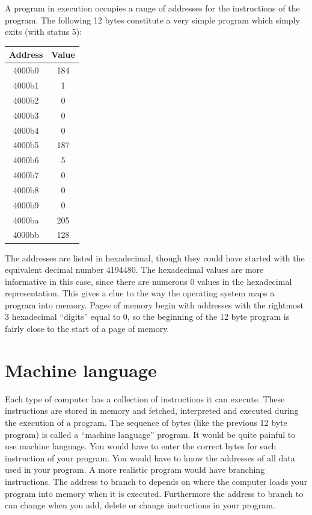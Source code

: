 \documentclass[11pt,b5paper]{book}
\begin{document}
A program in execution occupies a range of addresses for the instructions of
the program.  The following 12 bytes constitute a very simple program which
simply exits (with status 5):
\begin{center}
\begin{tabular}{|c|c|}
\hline
Address & Value \\
\hline
4000b0 & 184 \\
\hline
4000b1 & 1 \\
\hline
4000b2 & 0 \\
\hline
4000b3 & 0 \\
\hline
4000b4 & 0 \\
\hline
4000b5 & 187 \\
\hline
4000b6 & 5 \\
\hline
4000b7 & 0 \\
\hline
4000b8 & 0 \\
\hline
4000b9 & 0 \\
\hline
4000ba & 205 \\
\hline
4000bb & 128 \\
\hline
\end{tabular}
\end{center}

The addresses are listed in hexadecimal,  though they could have started with
the equivalent decimal number 4194480.
The hexadecimal values are more informative in this case, since there are
numerous 0 values in the hexadecimal representation.
This gives a clue to the way the operating system maps a program into memory.
Pages of memory begin with addresses with the rightmost 3 hexadecimal ``digits''
equal to 0, so the beginning of the 12 byte program is fairly close to the
start of a page  of memory.

\section{Machine language}

Each type of computer has a collection of instructions  it can execute.
These instructions are stored in memory and fetched, interpreted and executed during
the execution of a program.
The sequence of bytes (like the previous 12 byte program) is called a
``machine language''  program.
It would be quite painful to use machine language.
You would have to enter the correct bytes for each instruction of your
program.
You would have to know the addresses of all data used in your program.
A more realistic program would have branching instructions.
The address to branch to depends on where the computer loads your program into
memory when it is executed.
Furthermore the address to branch to can change when you add, delete or change
instructions in your program.
\end{document}
